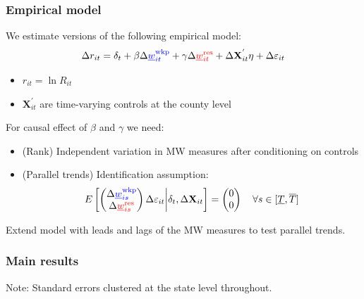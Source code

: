 \documentclass[aspectratio=169, t]{beamer}
\newcommand{\mw}{\underline{w}}
\newcommand{\wkp}{\text{wkp}}
\newcommand{\res}{\text{res}}
\begin{document}
\begin{frame}
    \frametitle{Empirical model}
        
    We estimate versions of the following empirical model:
    \[
    \Delta r_{it} = \delta_t +
        \beta \Delta {\color{blue}\mw^{\wkp}_{it}} +
        \gamma \Delta {\color{red}\mw^{\res}_{it}} + 
        \Delta \mathbf{X}^{'}_{it} \eta + 
        \Delta \varepsilon_{it} 
    \]
    \vspace{-5mm}
    \begin{itemize}
        \item $r_{it} = \ln R_{it}$
        \item $\mathbf{X}^{'}_{it}$ are time-varying controls at the county level
    \end{itemize}
    
    \pause
    \vspace{3mm}
    For causal effect of $\beta$ and $\gamma$ we need:
    \begin{itemize}
        \item (Rank) Independent variation in MW measures after conditioning on controls
        \item (Parallel trends) Identification assumption:
        $$
        E\left[
            \begin{pmatrix}
                \Delta {\color{blue}\mw^{\wkp}_{is}} \\
                \Delta {\color{red}\mw^{\res}_{is}} \\
            \end{pmatrix}
            \Delta \varepsilon_{it}
        \bigg| \delta_t, \Delta \mathbf{X}_{it} \right] =
        \begin{pmatrix}
            0 \\
            0 \\
        \end{pmatrix}
        \quad \forall s\in[\underline T, \overline T]
        $$
    \end{itemize}

    \vspace{2mm}
    Extend model with leads and lags of the MW measures to test parallel trends.
\end{frame}

\begin{frame}[label = static]
    \frametitle{Main results}

    
    
    \vspace{2mm}
    \footnotesize
    Note: Standard errors clustered at the state level throughout.

\end{frame}
\end{document}
